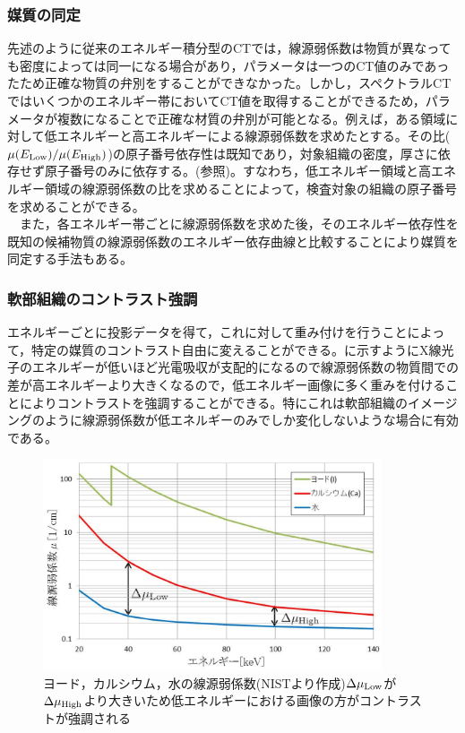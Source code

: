 \subsubsection{媒質の同定}
先述のように従来のエネルギー積分型のCTでは，線源弱係数は物質が異なっても密度によっては同一になる場合があり，パラメータは一つのCT値のみであったため正確な物質の弁別をすることができなかった。しかし，スペクトラルCTではいくつかのエネルギー帯においてCT値を取得することができるため，パラメータが複数になることで正確な材質の弁別が可能となる。例えば，ある領域に対して低エネルギーと高エネルギーによる線源弱係数を求めたとする。その比($\mu(E_{\rm Low})/\mu(E_{\rm High})$)の原子番号依存性は既知であり，対象組織の密度，厚さに依存せず原子番号のみに依存する。(参照)。すなわち，低エネルギー領域と高エネルギー領域の線源弱係数の比を求めることによって，検査対象の組織の原子番号を求めることができる\cite{material_id}。\\
\ \ また，各エネルギー帯ごとに線源弱係数を求めた後，そのエネルギー依存性を既知の候補物質の線源弱係数のエネルギー依存曲線と比較することにより媒質を同定する手法もある\cite{ogawa_id}。



\subsubsection{軟部組織のコントラスト強調}
エネルギーごとに投影データを得て，これに対して重み付けを行うことによって，特定の媒質のコントラスト自由に変えることができる。に示すようにX線光子のエネルギーが低いほど光電吸収が支配的になるので線源弱係数の物質間での差が高エネルギーより大きくなるので，低エネルギー画像に多く重みを付けることによりコントラストを強調することができる。特にこれは軟部組織のイメージングのように線源弱係数が低エネルギーのみでしか変化しないような場合に有効である\cite{kowase}\cite{ogawa_kaisetu}。

\begin{figure}[H]
 \begin{center}
 \includegraphics[width=10cm]{image/other/material_atten.eps}
 \end{center}
  \vspace{-0.7cm}
 \caption{ヨード，カルシウム，水の線源弱係数(NISTより作成)\newline $\Delta\mu_{\rm Low}$が$\Delta\mu_{\rm High}$より大きいため低エネルギーにおける画像の方がコントラストが強調される}
 \label{fig:material_atten}
\end{figure}


